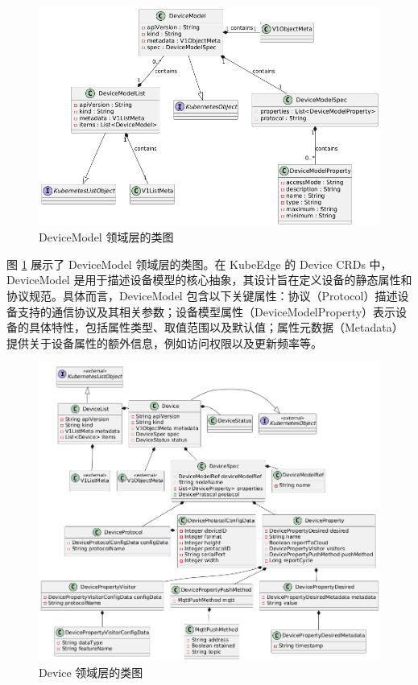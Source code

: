 \begin{figure}[ht]
  \centering
  \includegraphics[width=0.95\linewidth]{pics/4-9devicemodel类图.png}
  \caption{DeviceModel 领域层的类图}
  \label{fig:4-9devicemodel}
\end{figure}

图 \ref{fig:4-9devicemodel} 展示了 DeviceModel 领域层的类图。在 KubeEdge 的 Device CRDs 中，DeviceModel 是用于描述设备模型的核心抽象，其设计旨在定义设备的静态属性和协议规范。具体而言，DeviceModel 包含以下关键属性：协议（Protocol）描述设备支持的通信协议及其相关参数；设备模型属性（DeviceModelProperty）表示设备的具体特性，包括属性类型、取值范围以及默认值；属性元数据（Metadata）提供关于设备属性的额外信息，例如访问权限以及更新频率等。

\begin{figure}[ht]
  \centering
  \includegraphics[width=\linewidth]{pics/4-8device类图.png}
  \caption{Device 领域层的类图}
  \label{fig:4-8device}
\end{figure}


